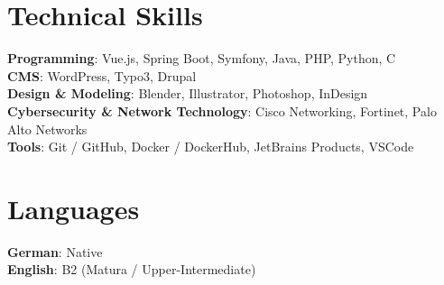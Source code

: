 \documentclass[letterpaper,11pt]{article}
\begin{document}
\section{Technical Skills}
 \begin{itemize}[leftmargin=0.15in, label={}]
    \small{\item{
     \textbf{Programming}{: Vue.js, Spring Boot, Symfony, Java, PHP, Python, C} \\
     \textbf{CMS}{: WordPress, Typo3, Drupal} \\
     \textbf{Design \& Modeling}{: Blender, Illustrator, Photoshop, InDesign} \\
     \textbf{Cybersecurity \& Network Technology}{: Cisco Networking, Fortinet, Palo Alto Networks} \\
     \textbf{Tools}{: Git / GitHub, Docker / DockerHub, JetBrains Products, VSCode}
    }}
 \end{itemize}


\section{Languages}
 \begin{itemize}[leftmargin=0.15in, label={}]
    \small{\item{
     \textbf{German}{: Native} \\
     \textbf{English}{: B2 (Matura / Upper-Intermediate)}
    }}
 \end{itemize}


\end{document}
